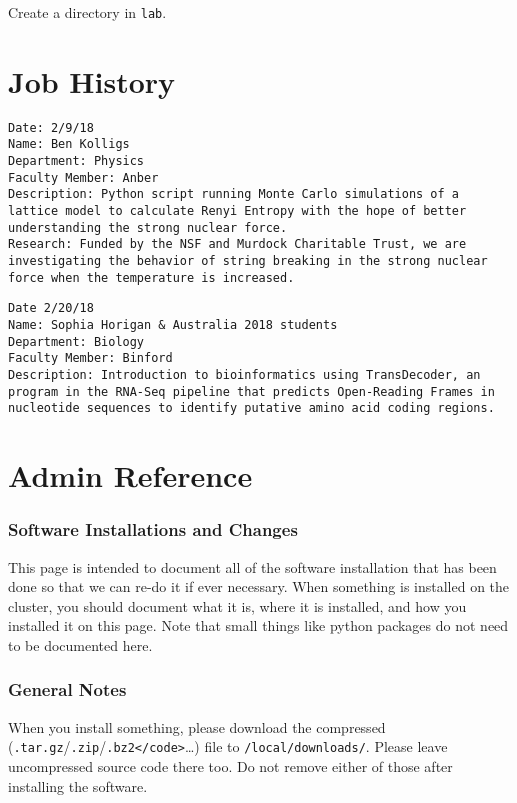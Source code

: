 \documentclass[]{book}
\theoremstyle{definition}
\theoremstyle{definition}
\theoremstyle{definition}
\theoremstyle{remark}
\begin{document}
Create a directory in \texttt{lab}.

\appendix


\chapter{Job History}\label{job-history}

\begin{verbatim}
Date: 2/9/18
Name: Ben Kolligs
Department: Physics
Faculty Member: Anber
Description: Python script running Monte Carlo simulations of a lattice model to calculate Renyi Entropy with the hope of better understanding the strong nuclear force.
Research: Funded by the NSF and Murdock Charitable Trust, we are investigating the behavior of string breaking in the strong nuclear force when the temperature is increased.
\end{verbatim}

\begin{verbatim}
Date 2/20/18
Name: Sophia Horigan & Australia 2018 students
Department: Biology
Faculty Member: Binford
Description: Introduction to bioinformatics using TransDecoder, an program in the RNA-Seq pipeline that predicts Open-Reading Frames in nucleotide sequences to identify putative amino acid coding regions.
\end{verbatim}

\chapter{Admin Reference}\label{admin-reference}

\subsection{Software Installations and
Changes}\label{software-installations-and-changes}

This page is intended to document all of the software installation that
has been done so that we can re-do it if ever necessary. When something
is installed on the cluster, you should document what it is, where it is
installed, and how you installed it on this page. Note that small things
like python packages do not need to be documented here.

\subsection{General Notes}\label{general-notes}

When you install something, please download the compressed
(\texttt{.tar.gz}/\texttt{.zip}/\texttt{.bz2\textless{}/code\textgreater{}}\ldots{})
file to \texttt{/local/downloads/}. Please leave uncompressed source
code there too. Do not remove either of those after installing the
software.
\end{document}
